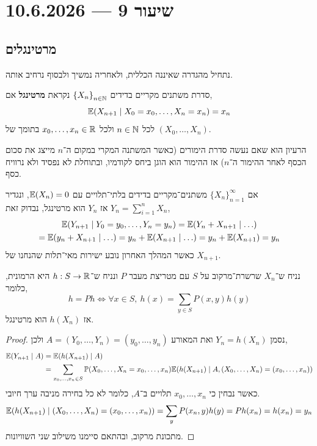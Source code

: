 \section{שיעור 9 --- 10.6.2026}
\subsection{מרטינגלים}
נתחיל מהגדרה שאיננה הכללית, ולאחריה נמשיך ולבסוף נרחיב אותה.
\begin{definition}[מרטינגל]
	סדרת משתנים מקריים בדידים ${\{ X_n \}}_{n \in \mathbb{N}}$ נקראת \textbf{מרטינגל} אם,
	\[
		\mathbb{E}(X_{n + 1} \mid X_0 = x_0, \ldots, X_n = x_n)
		= x_n
	\]
	לכל $n \in \mathbb{N}$ ולכל $x_0, \ldots, x_n \in \mathbb{R}$ בתומך של $(X_0, \ldots, X_n)$.
\end{definition}
הרעיון הוא שאם נעשה סדרת הימורים (כאשר המשתנה המקרי במקום ה־$n$ מייצג את סכום הכסף לאחר ההימור ה־$n$) אז ההימור הוא הוגן ביחס לקודמיו, ובתוחלת לא נפסיד ולא נרוויח כסף.
\begin{example}
	אם ${\{ X_n \}}_{n = 1}^\infty$ משתנים־מקריים בדידים בלתי־תלויים עם $\mathbb{E}(X_n) = 0$,
	ונגדיר $Y_n = \sum_{i = 1}^n X_n$ אז $Y_n$ הוא מרטינגל, נבדוק זאת,
	\begin{multline*}
		\mathbb{E}(Y_{n + 1} \mid Y_0 = y_0, \ldots, Y_n = y_n)
		= \mathbb{E}(Y_n + X_{n + 1} \mid \ldots) \\
		= \mathbb{E}(y_n + X_{n + 1} \mid \ldots)
		= y_n + \mathbb{E}(X_{n + 1} \mid \ldots)
		= y_n + \mathbb{E}(X_{n + 1})
		= y_n
	\end{multline*}
	כאשר המהלך האחרון נובע ישירות מאי־תלות שהנחנו של $X_{n + 1}$.
\end{example}
\begin{example}
	נניח ש־$X_n$ שרשרת־מרקוב על $S$ עם מטריצת מעבר $P$ ונניח ש־$h : S \to \mathbb{R}$ היא הרמונית, כלומר,
	\[
		h = P h
		\iff \forall x \in S,\ h(x) = \sum_{y \in S} P(x, y) h(y)
	\]
	אז $h(X_n)$ הוא מרטינגל.
\end{example}
\begin{proof}
	נסמן $Y_n = h(X_n)$ ואת המאורע $A = (Y_0, \ldots, Y_n) = (y_0, \ldots, y_n)$ ולכן,
	\begin{align*}
		\mathbb{E}(Y_{n + 1} \mid A)
		& = \mathbb{E}(h(X_{n + 1}) \mid A) \\
		& = \sum_{x_0, \ldots, x_n \in S} \mathbb{P}(X_0, \ldots, X_n = x_0, \ldots, x_n) \mathbb{E}(h(X_{n + 1}) \mid A, (X_0, \ldots, X_n) = (x_0, \ldots, x_n))
	\end{align*}
	כאשר נבחין כי $x_0, \ldots, x_n$ תלויים ב־$A$, כלומר לא כל בחירה מניבה ערך חיובי.
	\[
		\mathbb{E}(h(X_{n + 1}) \mid (X_0, \ldots, X_n) = (x_0, \ldots, x_n))
		= \sum_y P(x_n, y) h(y)
		= P h(x_n)
		= h(x_n)
		= y_n
	\]
	מתכונת מרקוב, ובהתאם סיימנו משילוב שני השוויונות.
\end{proof}
